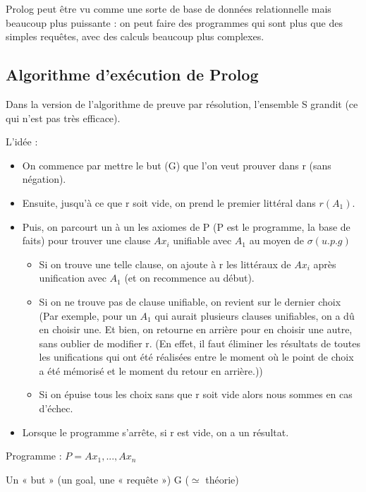 	 Prolog peut être vu comme une sorte de base de données relationnelle mais beaucoup plus puissante : on peut faire des programmes qui sont plus que des simples requêtes, avec des calculs beaucoup plus complexes.
	 
\subsection{Algorithme d'exécution de Prolog}

Dans la version de l’algorithme de preuve par résolution, l’ensemble S grandit (ce qui n’est pas très efficace).

L’idée :
\begin{itemize}
	\item On commence par mettre le but (G) que l’on veut prouver dans r (sans négation).
	\item Ensuite, jusqu’à ce que r soit vide, on prend le premier littéral dans $r(A_{1})$.
	\item Puis, on parcourt un à un les axiomes de P (P est le programme, la base de faits) pour trouver une clause $Ax_{i}$ unifiable avec $A_{1}$ au moyen de $\sigma(u.p.g)$
	\begin{itemize}
		\item Si on trouve une telle clause, on ajoute à r les littéraux de $Ax_{i}$ après unification avec $A_{1}$ (et on recommence au début).
		\item Si on ne trouve pas de clause unifiable, on revient sur le dernier choix (Par exemple, pour un $A_{1}$ qui aurait plusieurs clauses unifiables, on a dû en choisir une. Et bien, on retourne en arrière pour en choisir une autre, sans oublier de modifier r. (En effet, il faut éliminer les résultats de toutes les unifications qui ont été réalisées entre le moment où le point de choix a été mémorisé et le moment du retour en arrière.))
		\item Si on épuise tous les choix sans que r soit vide alors nous sommes en cas d’échec.
	\end{itemize}
	\item Lorsque le programme s’arrête, si r est vide, on a un résultat.
\end{itemize}

Programme  : $P={Ax_{1}, ..., Ax_{n}}$

Un « but » (un goal, une « requête ») G ($\simeq$ théorie)


